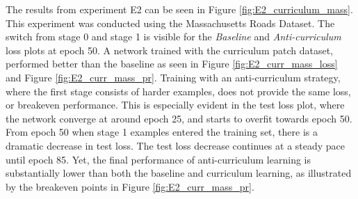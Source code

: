 

The results from experiment  E2 can be seen in Figure \ref{fig:E2_curriculum_mass}. This experiment was conducted using the Massachusetts Roads Dataset. The switch from stage 0 and stage 1 is visible for the \textit{Baseline} and \textit{Anti-curriculum} loss plots at epoch 50. A network trained with the curriculum patch dataset, performed better than the baseline as seen in Figure \ref{fig:E2_curr_mass_loss} and Figure \ref{fig:E2_curr_mass_pr}. Training with an anti-curriculum strategy, where the first stage consists of harder examples, does not provide the same loss, or breakeven performance. This is especially evident in the test loss plot, where the network converge at around epoch 25, and starts to overfit towards epoch 50. From epoch 50 when stage 1 examples entered the training set, there is a dramatic decrease in test loss. The test loss decrease continues at a steady pace until epoch 85. Yet, the final performance of anti-curriculum learning is substantially lower than both the baseline and curriculum learning, as illustrated by the breakeven points in Figure \ref{fig:E2_curr_mass_pr}.\\

